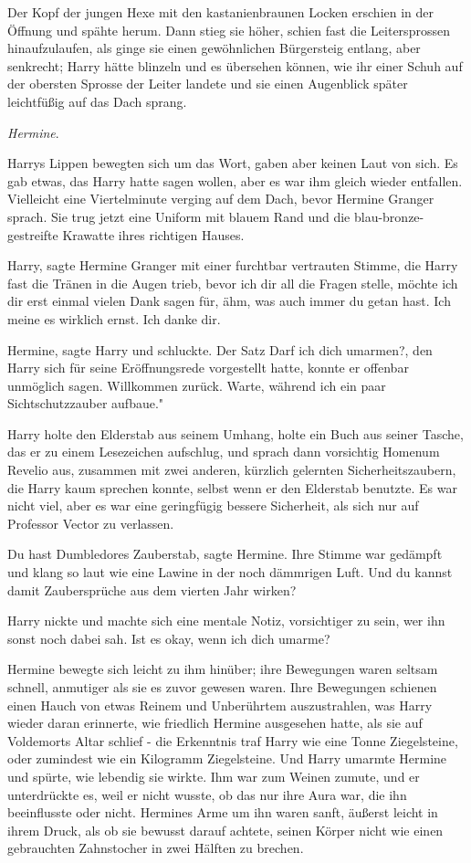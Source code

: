 Der Kopf der jungen Hexe mit den kastanienbraunen Locken erschien in der Öffnung
und spähte herum. Dann stieg sie höher, schien fast die Leitersprossen
hinaufzulaufen, als ginge sie einen gewöhnlichen Bürgersteig entlang, aber
senkrecht; Harry hätte blinzeln und es übersehen können, wie ihr einer Schuh auf
der obersten Sprosse der Leiter landete und sie einen Augenblick später
leichtfüßig auf das Dach sprang.

\emph{Hermine}.

Harrys Lippen bewegten sich um das Wort, gaben aber keinen Laut von sich. Es gab
etwas, das Harry hatte sagen wollen, aber es war ihm gleich wieder entfallen.
Vielleicht eine Viertelminute verging auf dem Dach, bevor Hermine Granger
sprach. Sie trug jetzt eine Uniform mit blauem Rand und die
blau-bronze-gestreifte Krawatte ihres richtigen Hauses.

\glqq Harry\grqq{}, sagte Hermine Granger mit einer furchtbar vertrauten Stimme,
die Harry fast die Tränen in die Augen trieb, \glqq bevor ich dir all die Fragen
stelle, möchte ich dir erst einmal vielen Dank sagen für, ähm, was auch immer du
getan hast. Ich meine es wirklich ernst. Ich danke dir.\grqq{}

\glqq Hermine\grqq{}, sagte Harry und schluckte. Der Satz \glqq Darf ich dich
umarmen?\grqq{}, den Harry sich für seine Eröffnungsrede vorgestellt hatte,
konnte er offenbar unmöglich sagen. \glqq Willkommen zurück. Warte, während ich
ein paar Sichtschutzzauber aufbaue."

Harry holte den Elderstab aus seinem Umhang, holte ein Buch aus seiner Tasche,
das er zu einem Lesezeichen aufschlug, und sprach dann vorsichtig \glqq Homenum
Revelio\grqq{} aus, zusammen mit zwei anderen, kürzlich gelernten
Sicherheitszaubern, die Harry kaum sprechen konnte, selbst wenn er den Elderstab
benutzte. Es war nicht viel, aber es war eine geringfügig bessere Sicherheit,
als sich nur auf Professor Vector zu verlassen.

\glqq Du hast Dumbledores Zauberstab\grqq{}, sagte Hermine. Ihre Stimme war
gedämpft und klang so laut wie eine Lawine in der noch dämmrigen Luft. \glqq Und
du kannst damit Zaubersprüche aus dem vierten Jahr wirken?\grqq{}

Harry nickte und machte sich eine mentale Notiz, vorsichtiger zu sein, wer ihn
sonst noch dabei sah. \glqq Ist es okay, wenn ich dich umarme?\grqq{}

Hermine bewegte sich leicht zu ihm hinüber; ihre Bewegungen waren seltsam
schnell, anmutiger als sie es zuvor gewesen waren. Ihre Bewegungen schienen
einen Hauch von etwas Reinem und Unberührtem auszustrahlen, was Harry wieder
daran erinnerte, wie friedlich Hermine ausgesehen hatte, als sie auf Voldemorts
Altar schlief - die Erkenntnis traf Harry wie eine Tonne Ziegelsteine, oder
zumindest wie ein Kilogramm Ziegelsteine. Und Harry umarmte Hermine und spürte,
wie lebendig sie wirkte. Ihm war zum Weinen zumute, und er unterdrückte es, weil
er nicht wusste, ob das nur ihre Aura war, die ihn beeinflusste oder nicht.
Hermines Arme um ihn waren sanft, äußerst leicht in ihrem Druck, als ob sie
bewusst darauf achtete, seinen Körper nicht wie einen gebrauchten Zahnstocher in
zwei Hälften zu brechen.

